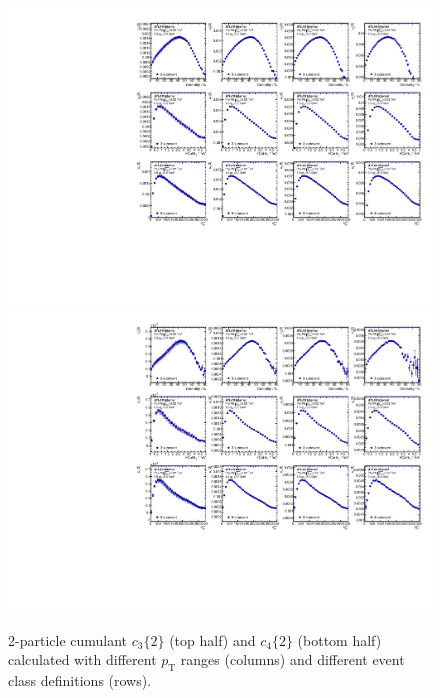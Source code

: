 \begin{figure}[H]
\centering
\includegraphics[width=.95\linewidth]{figs/sec_result/forQM/phy_c2_Har3.pdf}
\includegraphics[width=.95\linewidth]{figs/sec_result/forQM/phy_c2_Har4.pdf}
\caption{2-particle cumulant $c_3\{2\}$ (top half) and $c_4\{2\}$ (bottom half) calculated with different $p_\text{T}$ ranges (columns) and different event class definitions (rows).}
\label{fig:result_phy_c2_Har34}
\end{figure}

